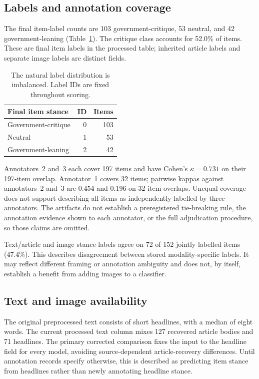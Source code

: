 \documentclass[11pt]{article}
\begin{document}
\subsection{Labels and annotation coverage}
The final item-label counts are 103 government-critique, 53 neutral, and 42 government-leaning (Table~\ref{tab:class_distribution}). The critique class accounts for 52.0\% of items. These are final item labels in the processed table; inherited article labels and separate image labels are distinct fields.

\begin{table}[t]
\centering
\small
\begin{tabular}{lrr}
\toprule
Final item stance & ID & Items \\
\midrule
Government-critique & 0 & 103 \\
Neutral & 1 & 53 \\
Government-leaning & 2 & 42 \\
\bottomrule
\end{tabular}
\caption{The natural label distribution is imbalanced. Label IDs are fixed throughout scoring.}\label{tab:class_distribution}
\end{table}

Annotators~2 and~3 each cover 197 items and have Cohen's $\kappa=0.731$ on their 197-item overlap. Annotator~1 covers 32 items; pairwise kappas against annotators~2 and~3 are 0.454 and 0.196 on 32-item overlaps. Unequal coverage does not support describing all items as independently labelled by three annotators. The artifacts do not establish a preregistered tie-breaking rule, the annotation evidence shown to each annotator, or the full adjudication procedure, so those claims are omitted.

Text/article and image stance labels agree on 72 of 152 jointly labelled items (47.4\%). This describes disagreement between stored modality-specific labels. It may reflect different framing or annotation ambiguity and does not, by itself, establish a benefit from adding images to a classifier.

\subsection{Text and image availability}
The original preprocessed text consists of short headlines, with a median of eight words. The current processed text column mixes 127 recovered article bodies and 71 headlines. The primary corrected comparison fixes the input to the headline field for every model, avoiding source-dependent article-recovery differences. Until annotation records specify otherwise, this is described as predicting item stance from headlines rather than newly annotating headline stance.
\end{document}
